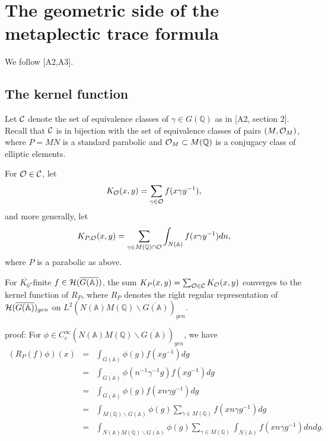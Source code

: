 \section{The geometric side of the metaplectic trace formula}

We follow [A2,A3].

\subsection{The kernel function}

Let ${\cal{C}}$ denote the set of equivalence classes of
$\gamma \in G({\mathbb{Q}})$ as in [A2, section 2].
Recall that ${\cal{C}}$ is in bijection
with the set of equivalence classes of pairs $(M,{\cal{O}}_M)$,
where $P=MN $ is a standard parabolic and
${\cal{O}}_M\subset M({\mathbb{Q}})$ is a
conjugacy class of elliptic elements.

For ${\cal{O}}\in {\cal{C}}$, let 
\[
K_{{\cal{O}}}(x,y)=\sum_{\gamma \in {\cal{O}}}f(x\gamma y^{-1}),
\]
and more generally, let 
\begin{equation}
K_{P,{\cal{O}}}(x,y)=\sum_{\gamma \in M({\mathbb{Q}})\cap {\cal{O}}}
\int_{N({\mathbb{A}})}f(x\gamma y^{-1})dn,
\end{equation}
where $P$ is a parabolic as above.

\begin{lemma}
For $\overline{K_0}$-finite
$f\in {\cal{H}}(\overline{G({\mathbb{A}})})$, the sum
$K_P(x,y)=\sum_{{\cal{O}}\in {\cal{C}}}K_{{\cal{O}}}(x,y)$
converges to the kernel
function of $R_P$, where $R_P$ denotes the right
regular representation of
${\cal{H}}(\overline{G({\mathbb{A}})})_{gen}$ on
$L^2(N({\mathbb{A}})M({\mathbb{Q}})\backslash \overline{G({\mathbb{A}})})_{gen}$.
\end{lemma}

proof: For
$\phi \in C_c^\infty (N({\mathbb{A}})M({\mathbb{Q}})
\backslash \overline{G({\mathbb{A}})})_{gen}$, we have 
\begin{eqnarray*}
(R_P(f)\phi )(x) &=&\int_{\overline{G({\mathbb{A}})}}\phi (g)f(xg^{-1})dg \\
&=&\int_{\overline{G({\mathbb{A}})}}\phi (n^{-1}\gamma ^{-1}g)f(xg^{-1})dg \\
&=&\int_{\overline{G({\mathbb{A}})}}\phi (g)f(xn\gamma g^{-1})dg \\
&=&\int_{M({\mathbb{Q}})\backslash \overline{G({\mathbb{A}})}}\phi (g)\sum_{\gamma \in
M({\mathbb{Q}})}f(xn\gamma g^{-1})dg \\
&=&\int_{N({\mathbb{A}})M({\mathbb{Q}})\backslash \overline{G({\mathbb{A}})}}\phi
(g)\sum_{\gamma \in M({\mathbb{Q}})}\int_{N({\mathbb{A}})}f(xn\gamma g^{-1})dndg.
\end{eqnarray*}

